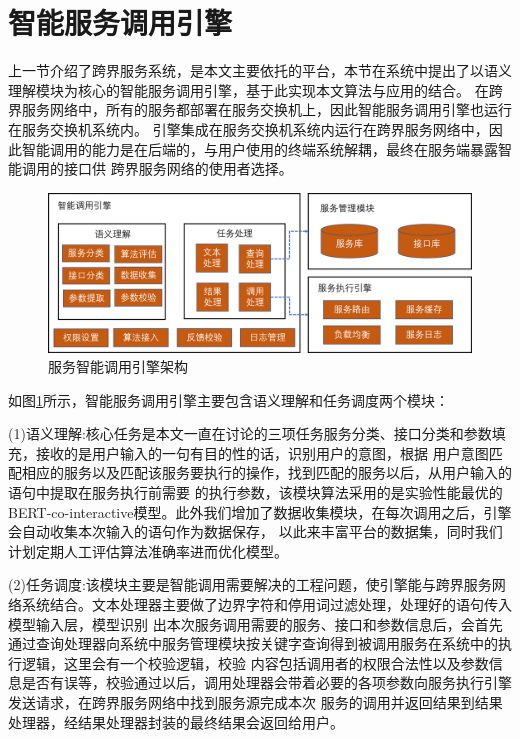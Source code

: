   
  
  
\section{智能服务调用引擎}
上一节介绍了跨界服务系统，是本文主要依托的平台，本节在系统中提出了以语义理解模块为核心的智能服务调用引擎，基于此实现本文算法与应用的结合。
在跨界服务网络中，所有的服务都部署在服务交换机上，因此智能服务调用引擎也运行在服务交换机系统内。
引擎集成在服务交换机系统内运行在跨界服务网络中，因此智能调用的能力是在后端的，与用户使用的终端系统解耦，最终在服务端暴露智能调用的接口供
跨界服务网络的使用者选择。

\begin{figure}[htbp]
  \centering
  \includegraphics[width=15cm]{./images/yinqing.png}
  \caption{服务智能调用引擎架构}
  \label{fig:yinqing}
\end{figure}

如图\ref{fig:yinqing}所示，智能服务调用引擎主要包含语义理解和任务调度两个模块：

(1)语义理解:核心任务是本文一直在讨论的三项任务服务分类、接口分类和参数填充，接收的是用户输入的一句有目的性的话，识别用户的意图，根据
用户意图匹配相应的服务以及匹配该服务要执行的操作，找到匹配的服务以后，从用户输入的语句中提取在服务执行前需要
的执行参数，该模块算法采用的是实验性能最优的BERT-co-interactive模型。此外我们增加了数据收集模块，在每次调用之后，引擎会自动收集本次输入的语句作为数据保存，
以此来丰富平台的数据集，同时我们计划定期人工评估算法准确率进而优化模型。

(2)任务调度:该模块主要是智能调用需要解决的工程问题，使引擎能与跨界服务网络系统结合。文本处理器主要做了边界字符和停用词过滤处理，处理好的语句传入模型输入层，模型识别
出本次服务调用需要的服务、接口和参数信息后，会首先通过查询处理器向系统中服务管理模块按关键字查询得到被调用服务在系统中的执行逻辑，这里会有一个校验逻辑，校验
内容包括调用者的权限合法性以及参数信息是否有误等，校验通过以后，调用处理器会带着必要的各项参数向服务执行引擎发送请求，在跨界服务网络中找到服务源完成本次
服务的调用并返回结果到结果处理器，经结果处理器封装的最终结果会返回给用户。

